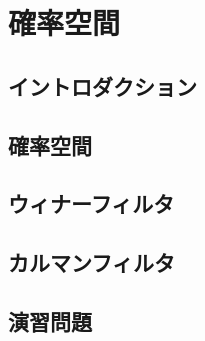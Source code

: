 \documentclass[../../main]{subfiles}
\begin{document}
\chapter{確率空間}
\label{chapter:probability_space}

\section{イントロダクション}

\section{確率空間}

\section{ウィナーフィルタ}

\section{カルマンフィルタ}

\section*{演習問題}
\end{document}
